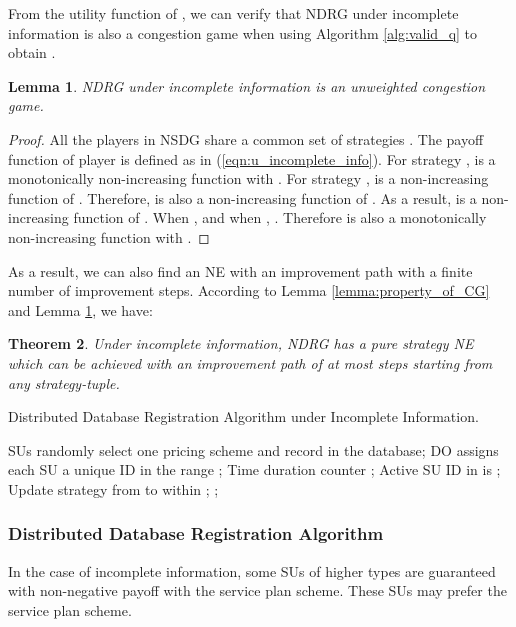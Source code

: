 \documentclass[journal]{IEEEtran}
\newtheorem{theorem}{Theorem}
\newtheorem{lemma}[theorem]{Lemma}
\begin{document}
From the utility function of , we can verify that NDRG under incomplete information is also a congestion game when using Algorithm \ref{alg:valid_q} to obtain .
\begin{lemma}
\label{lemma:NDRG_is_CG2}
NDRG under incomplete information is an unweighted congestion game.
\end{lemma}
\begin{proof}
All the players in NSDG share a common set of strategies . The payoff function of player  is defined as  in (\ref{eqn:u_incomplete_info}). For strategy ,  is a monotonically non-increasing function with . For strategy ,  is a non-increasing function of . Therefore,  is also a non-increasing function of . As a result,  is a non-increasing function of .
When ,  and when , . Therefore  is also a monotonically non-increasing function with .
\end{proof}
As a result, we can also find an NE with an improvement path with a finite number of improvement steps. According to Lemma \ref{lemma:property_of_CG} and Lemma \ref{lemma:NDRG_is_CG2}, we have:
\begin{theorem}
\label{thm:NDRG_property2}
Under incomplete information, NDRG has a pure strategy NE which can be achieved with an improvement path of at most  steps starting from any strategy-tuple.
\end{theorem}

\begin{algorithm}[tp]
\caption {Distributed Database Registration Algorithm under Incomplete Information.}
\label{alg:registration_incomplete_info}
\begin{algorithmic}[1]
\STATE SUs randomly select one pricing scheme and record in the database;
\STATE DO assigns each SU a unique ID in the range ;
\STATE Time duration counter ;
\STATE Active SU ID in  is ;
\IF {}
\STATE Update strategy from  to  within ;
\ENDIF
\STATE ;
\ENDWHILE
\end{algorithmic}
\end{algorithm}

\subsubsection{Distributed Database Registration Algorithm}

In the case of incomplete information, some SUs of higher types are guaranteed with non-negative payoff with the service plan scheme. These SUs may prefer the service plan scheme.
\end{document}

